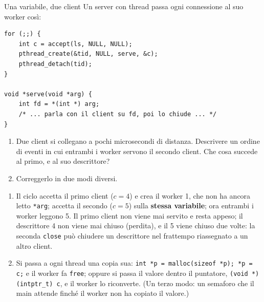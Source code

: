 \begin{esercizio}{Una variabile, due client}
Un server con thread passa ogni connessione al suo worker così:
\begin{lstlisting}[language={[POSIX]C}]
for (;;) {
    int c = accept(ls, NULL, NULL);
    pthread_create(&tid, NULL, serve, &c);
    pthread_detach(tid);
}

void *serve(void *arg) {
    int fd = *(int *) arg;
    /* ... parla con il client su fd, poi lo chiude ... */
}
\end{lstlisting}
\begin{enumerate}[label=(\alph*)]
    \item Due client si collegano a pochi microsecondi di distanza. Descrivere un ordine di eventi in cui entrambi i worker servono il
          secondo client. Che cosa succede al primo, e al suo descrittore?
    \item Correggerlo in due modi diversi.
\end{enumerate}

\svolgimento
\begin{enumerate}[label=(\alph*)]
    \item Il ciclo accetta il primo client ($c = 4$) e crea il worker 1, che non ha ancora letto \texttt{*arg}; accetta il secondo
          ($c = 5$) sulla \textbf{stessa variabile}; ora entrambi i worker leggono 5. Il primo client non viene mai servito e resta appeso;
          il descrittore 4 non viene mai chiuso (perdita), e il 5 viene chiuso due volte: la seconda \texttt{close} può chiudere un
          descrittore nel frattempo riassegnato a un altro client.
    \item Si passa a ogni thread una copia sua: \texttt{int *p = malloc(sizeof *p); *p = c;} e il worker fa \texttt{free}; oppure si passa
          il valore dentro il puntatore, \texttt{(void *)(intptr\_t) c}, e il worker lo riconverte. (Un terzo modo: un semaforo che il main
          attende finché il worker non ha copiato il valore.)
\end{enumerate}
\end{esercizio}

